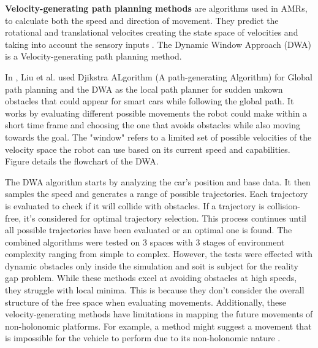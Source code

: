 \textbf{Velocity-generating path planning methods} are algorithms used in AMRs, to calculate both 
the speed and direction of movement. They predict the rotational and translational velocites 
creating the state space of velocities and taking into account the sensory inputs \cite{R28}. 
The Dynamic Window Approach (DWA) is a Velocity-generating path planning method.

In \cite{R19}, Liu et al. used Djikstra ALgorithm (A path-generating Algorithm) 
for Global path planning and 
the DWA as the local path planner for sudden unkown obstacles that could 
appear for smart cars while following the global path.
It works by evaluating different possible movements the robot could make within a short time frame 
and choosing the one that avoids obstacles while also moving towards the goal. The "window" refers 
to a limited set of possible velocities of the velocity space the robot can use based on its current 
speed and capabilities. Figure  details the flowchart of the DWA. 

The DWA algorithm starts by analyzing the car's position and base data. It then samples the speed and 
generates a range of possible trajectories. Each trajectory is evaluated to check if it will collide with 
obstacles. If a trajectory is collision-free, it's considered for optimal trajectory selection. This process 
continues until all possible trajectories have been evaluated or an optimal one is found.
The combined algorithms were tested on 3 spaces with 3 stages of environment complexity ranging from 
simple to complex. However, the tests were effected with dynamic obstacles only inside the simulation and
soit is subject for the reality gap problem.
While these methods excel at avoiding obstacles at high speeds, they struggle with local minima. This is 
because they don't consider the overall structure of the free space when evaluating movements.
Additionally, these velocity-generating methods have limitations in mapping the future movements of 
non-holonomic platforms. For example, a method might suggest a movement that is impossible for the 
vehicle to perform due to its non-holonomic nature \cite{R28}.

